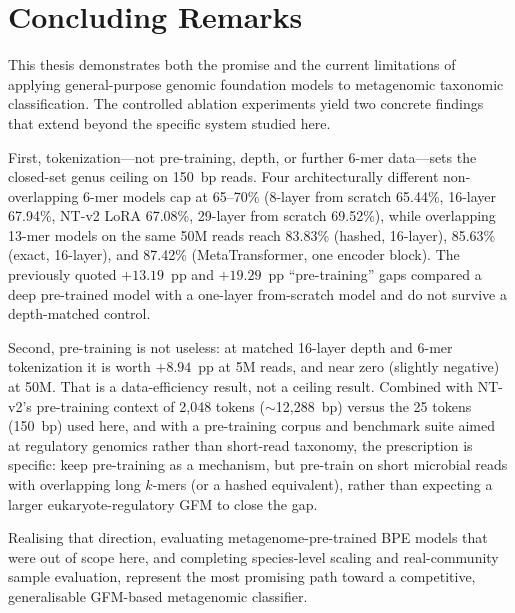 \section{Concluding Remarks}

This thesis demonstrates both the promise and the current limitations of applying general-purpose genomic foundation models to metagenomic taxonomic classification. The controlled ablation experiments yield two concrete findings that extend beyond the specific system studied here.

First, tokenization---not pre-training, depth, or further 6-mer data---sets the closed-set genus ceiling on 150~bp reads. Four architecturally different non-overlapping 6-mer models cap at 65--70\% (8-layer from scratch 65.44\%, 16-layer 67.94\%, NT-v2 LoRA 67.08\%, 29-layer from scratch 69.52\%), while overlapping 13-mer models on the same 50M reads reach 83.83\% (hashed, 16-layer), 85.63\% (exact, 16-layer), and 87.42\% (MetaTransformer, one encoder block). The previously quoted $+13.19$~pp and $+19.29$~pp ``pre-training'' gaps compared a deep pre-trained model with a one-layer from-scratch model and do not survive a depth-matched control.

Second, pre-training is not useless: at matched 16-layer depth and 6-mer tokenization it is worth $+8.94$~pp at 5M reads, and near zero (slightly negative) at 50M. That is a data-efficiency result, not a ceiling result. Combined with NT-v2's pre-training context of 2{,}048 tokens ($\sim$12{,}288~bp) versus the 25 tokens (150~bp) used here, and with a pre-training corpus and benchmark suite aimed at regulatory genomics rather than short-read taxonomy, the prescription is specific: keep pre-training as a mechanism, but pre-train on short microbial reads with overlapping long $k$-mers (or a hashed equivalent), rather than expecting a larger eukaryote-regulatory GFM to close the gap.

Realising that direction, evaluating metagenome-pre-trained BPE models that were out of scope here, and completing species-level scaling and real-community sample evaluation, represent the most promising path toward a competitive, generalisable GFM-based metagenomic classifier.

